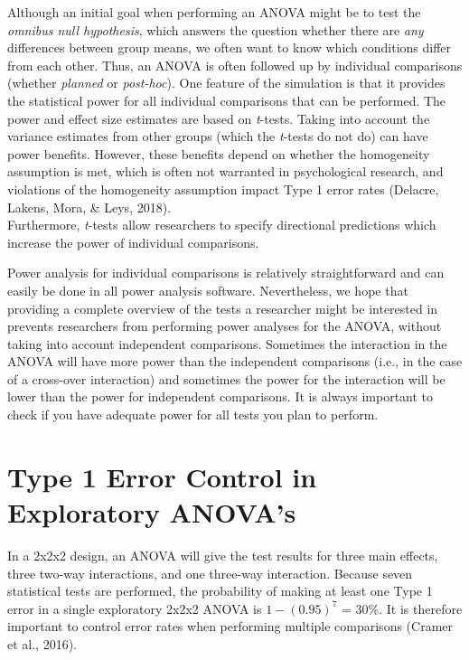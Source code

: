 \documentclass[,jou,floatsintext]{apa6}
\begin{document}
Although an initial goal when performing an ANOVA might be to test the \emph{omnibus null hypothesis}, which answers the question whether there are \emph{any} differences between group means, we often want to know which conditions differ from each other. Thus, an ANOVA is often followed up by individual comparisons (whether \emph{planned} or \emph{post-hoc}).
One feature of the simulation is that it provides the statistical power for all individual comparisons that can be performed.
The power and effect size estimates are based on \emph{t}-tests.
Taking into account the variance estimates from other groups (which the \emph{t}-tests do not do) can have power benefits.
However, these benefits depend on whether the homogeneity assumption is met, which is often not warranted in psychological research, and violations of the homogeneity assumption impact Type 1 error rates (Delacre, Lakens, Mora, \& Leys, 2018).\\
Furthermore, \emph{t}-tests allow researchers to specify directional predictions which increase the power of individual comparisons.

Power analysis for individual comparisons is relatively straightforward and can easily be done in all power analysis software.
Nevertheless, we hope that providing a complete overview of the tests a researcher might be interested in prevents researchers from performing power analyses for the ANOVA, without taking into account independent comparisons.
Sometimes the interaction in the ANOVA will have more power than the independent comparisons (i.e., in the case of a cross-over interaction) and sometimes the power for the interaction will be lower than the power for independent comparisons.
It is always important to check if you have adequate power for all tests you plan to perform.

\hypertarget{type-1-error-control-in-exploratory-anovas}{%
\section{Type 1 Error Control in Exploratory ANOVA's}\label{type-1-error-control-in-exploratory-anovas}}

In a 2x2x2 design, an ANOVA will give the test results for three main effects, three two-way interactions, and one three-way interaction.
Because seven statistical tests are performed, the probability of making at least one Type 1 error in a single exploratory 2x2x2 ANOVA is \(1-(0.95)^7\) = 30\%.
It is therefore important to control error rates when performing multiple comparisons (Cramer et al., 2016).
\end{document}

